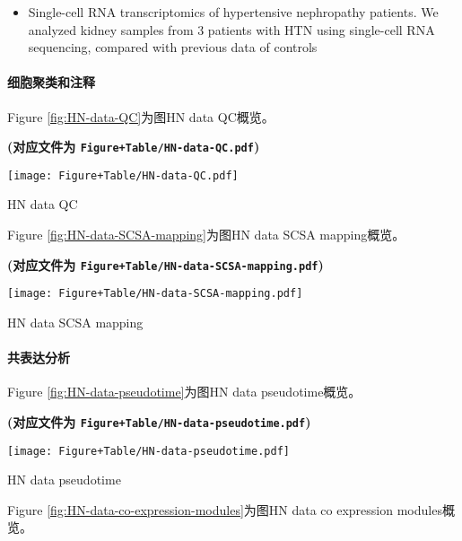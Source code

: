 \documentclass[
]{article}
\providecommand{\tightlist}{%
  \setlength{\itemsep}{0pt}\setlength{\parskip}{0pt}}
\begin{document}
\begin{itemize}
\tightlist
\item
  Single-cell RNA transcriptomics of hypertensive nephropathy patients. We
  analyzed kidney samples from 3 patients with HTN using single-cell RNA
  sequencing, compared with previous data of controls
\end{itemize}

\hypertarget{ux7ec6ux80deux805aux7c7bux548cux6ce8ux91ca-1}{%
\paragraph{细胞聚类和注释}\label{ux7ec6ux80deux805aux7c7bux548cux6ce8ux91ca-1}}

Figure \ref{fig:HN-data-QC}为图HN data QC概览。

\textbf{(对应文件为 \texttt{Figure+Table/HN-data-QC.pdf})}

\def\@captype{figure}
\begin{center}
\texttt{[image: Figure+Table/HN-data-QC.pdf]}
\caption{HN data QC}\label{fig:HN-data-QC}
\end{center}

Figure \ref{fig:HN-data-SCSA-mapping}为图HN data SCSA mapping概览。

\textbf{(对应文件为 \texttt{Figure+Table/HN-data-SCSA-mapping.pdf})}

\def\@captype{figure}
\begin{center}
\texttt{[image: Figure+Table/HN-data-SCSA-mapping.pdf]}
\caption{HN data SCSA mapping}\label{fig:HN-data-SCSA-mapping}
\end{center}

\hypertarget{ux5171ux8868ux8fbeux5206ux6790}{%
\paragraph{共表达分析}\label{ux5171ux8868ux8fbeux5206ux6790}}

Figure \ref{fig:HN-data-pseudotime}为图HN data pseudotime概览。

\textbf{(对应文件为 \texttt{Figure+Table/HN-data-pseudotime.pdf})}

\def\@captype{figure}
\begin{center}
\texttt{[image: Figure+Table/HN-data-pseudotime.pdf]}
\caption{HN data pseudotime}\label{fig:HN-data-pseudotime}
\end{center}

Figure \ref{fig:HN-data-co-expression-modules}为图HN data co expression modules概览。
\end{document}
